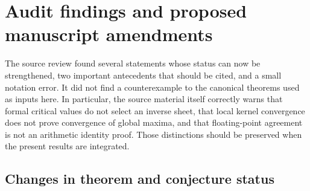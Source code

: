 \clearpage
\section{Audit findings and proposed manuscript amendments}
\label{sec:audit}

The source review found several statements whose status can now be
strengthened, two important antecedents that should be cited, and a
small notation error. It did not find a counterexample to the canonical
theorems used as inputs here. In particular, the source material itself
correctly warns that formal critical values do not select an inverse
sheet, that local kernel convergence does not prove convergence of
global maxima, and that floating-point agreement is not an arithmetic
identity proof. Those distinctions should be preserved when the present
results are integrated.

\subsection{Changes in theorem and conjecture status}

